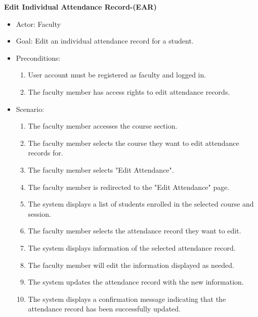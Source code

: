 \documentclass[letterpaper,12pt,oneside,listof=totoc]{scrreprt}
\begin{document}
\hfill \break
\textbf{Edit Individual Attendance Record-(EAR)}
\begin{itemize}
    \item Actor: Faculty
    \item Goal: Edit an individual attendance record for a student.
    \item Preconditions: 
    \begin{enumerate}
        \item User account must be registered as faculty and logged in.
        \item The faculty member has access rights to edit attendance records.
    \end{enumerate}
    \item Scenario:
    \begin{enumerate}
        \item The faculty member accesses the course section.
        \item The faculty member selects the course they want to edit attendance records for.
        \item The faculty member selects "Edit Attendance". 
        \item The faculty member is redirected to the "Edit Attendance" page.
        \item The system displays a list of students enrolled in the selected course and session.
        \item The faculty member selects the attendance record they want to edit.
        \item The system displays information of the selected attendance record.
        \item The faculty member will edit the information displayed as needed.
        \item The system updates the attendance record with the new information.
        \item The system displays a confirmation message indicating that the attendance record has been successfully updated.
    \end{enumerate}
\end{itemize}
\end{document}
